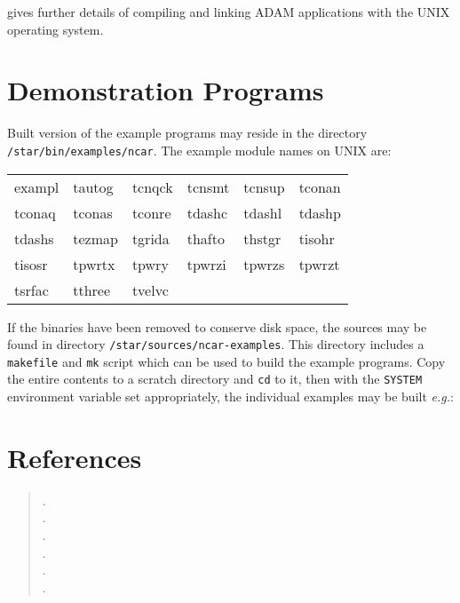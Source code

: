 \documentclass[twoside,11pt,nolof,noabs]{starlink}
\begin{document}
 gives further details of compiling and linking
ADAM applications with the UNIX operating system.

\section{Demonstration Programs}

Built version of the example programs may reside in the directory 
\texttt{/star/\-bin/\-examples/\-ncar}.  The example module names on UNIX are:

\begin{center}
\ttfamily
\begin{tabular}{llllll}
exampl & tautog & tcnqck & tcnsmt & tcnsup & tconan\\
tconaq & tconas & tconre & tdashc & tdashl & tdashp\\
tdashs & tezmap & tgrida & thafto & thstgr & tisohr\\
tisosr & tpwrtx & tpwry  & tpwrzi & tpwrzs & tpwrzt\\
tsrfac & tthree & tvelvc
\end{tabular}
\normalfont
\end{center}

If the binaries have been removed to conserve disk space, the sources may be
found in directory \texttt{/star/sources/\-ncar-examples}.
This directory includes a \texttt{makefile} and \texttt{mk} script which can be
used to build the example programs.  Copy the entire contents to a scratch
directory and \texttt{cd} to it, then with the \texttt{SYSTEM} environment
variable set appropriately, the individual examples may be built \emph{e.g.}:

\begin{quote}
\begin{terminalv}
\end{terminalv}
\end{quote}

\section{References}

\begin{verse}
.\\
.\\
.\\
.\\
.\\
.
\end{verse}
\end{document}
